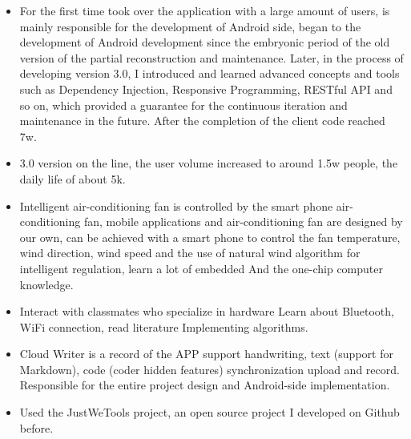 \documentclass{resume}
\begin{document}
\begin{itemize}
  \item For the first time took over the application with a large amount of users, is mainly responsible for the development of Android side, began to the development of Android development since the embryonic period of the old version of the partial reconstruction and maintenance. Later, in the process of developing version 3.0, I introduced and learned advanced concepts and tools such as Dependency Injection, Responsive Programming, RESTful API and so on, which provided a guarantee for the continuous iteration and maintenance in the future. After the completion of the client code reached 7w.
  \item 3.0 version on the line, the user volume increased to around 1.5w people, the daily life of about 5k.
\end{itemize}


\begin{itemize}
  \item Intelligent air-conditioning fan is controlled by the smart phone air-conditioning fan, mobile applications and air-conditioning fan are designed by our own, can be achieved with a smart phone to control the fan temperature, wind direction, wind speed and the use of natural wind algorithm for intelligent regulation, learn a lot of embedded And the one-chip computer knowledge.
  \item Interact with classmates who specialize in hardware Learn about Bluetooth, WiFi connection, read literature Implementing algorithms.
\end{itemize}



\begin{itemize}
  \item Cloud Writer is a record of the APP support handwriting, text (support for Markdown), code (coder hidden features) synchronization upload and record. Responsible for the entire project design and Android-side implementation.
  \item Used the JustWeTools project, an open source project I developed on Github before.
\end{itemize}
\end{document}
